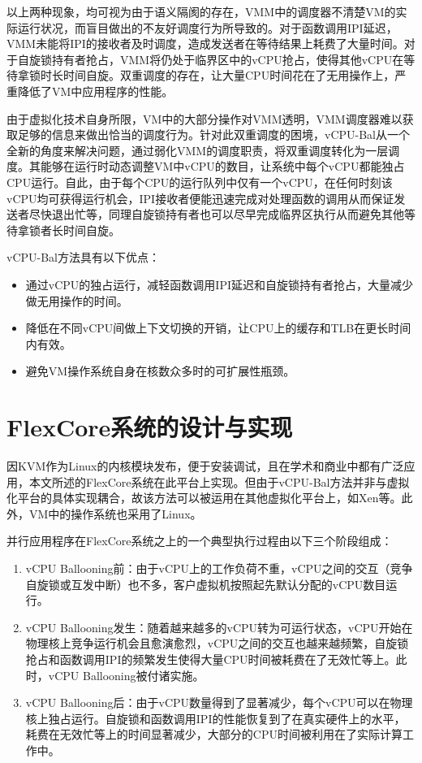 以上两种现象，均可视为由于语义隔阂的存在，VMM中的调度器不清楚VM的实际运行状况，而盲目做出的不友好调度行为所导致的。对于函数调用IPI延迟，VMM未能将IPI的接收者及时调度，造成发送者在等待结果上耗费了大量时间。对于自旋锁持有者抢占，VMM将仍处于临界区中的vCPU抢占，使得其他vCPU在等待拿锁时长时间自旋。双重调度的存在，让大量CPU时间花在了无用操作上，严重降低了VM中应用程序的性能。

由于虚拟化技术自身所限，VM中的大部分操作对VMM透明，VMM调度器难以获取足够的信息来做出恰当的调度行为。针对此双重调度的困境，vCPU-Bal从一个全新的角度来解决问题\cite{song2013schedule}，通过弱化VMM的调度职责，将双重调度转化为一层调度。其能够在运行时动态调整VM中vCPU的数目，让系统中每个vCPU都能独占CPU运行。自此，由于每个CPU的运行队列中仅有一个vCPU，在任何时刻该vCPU均可获得运行机会，IPI接收者便能迅速完成对处理函数的调用从而保证发送者尽快退出忙等，同理自旋锁持有者也可以尽早完成临界区执行从而避免其他等待拿锁者长时间自旋。

vCPU-Bal方法具有以下优点：

\begin{itemize}
\item 通过vCPU的独占运行，减轻函数调用IPI延迟和自旋锁持有者抢占，大量减少做无用操作的时间。
\item 降低在不同vCPU间做上下文切换的开销，让CPU上的缓存和TLB在更长时间内有效。
\item 避免VM操作系统自身在核数众多时的可扩展性瓶颈\cite{boyd2010analysis}。
\end{itemize}



\section{FlexCore系统的设计与实现}

因KVM\cite{kivity2007kvm}作为Linux的内核模块发布，便于安装调试，且在学术和商业中都有广泛应用，本文所述的FlexCore系统在此平台上实现。但由于vCPU-Bal方法并非与虚拟化平台的具体实现耦合，故该方法可以被运用在其他虚拟化平台上，如Xen\cite{barham2003xen}等。此外，VM中的操作系统也采用了Linux。

并行应用程序在FlexCore系统之上的一个典型执行过程由以下三个阶段组成：

\begin{enumerate}
\item vCPU Ballooning前：由于vCPU上的工作负荷不重，vCPU之间的交互（竞争自旋锁或互发中断）也不多，客户虚拟机按照起先默认分配的vCPU数目运行。
\item vCPU Ballooning发生：随着越来越多的vCPU转为可运行状态，vCPU开始在物理核上竞争运行机会且愈演愈烈，vCPU之间的交互也越来越频繁，自旋锁抢占和函数调用IPI的频繁发生使得大量CPU时间被耗费在了无效忙等上。此时，vCPU Ballooning被付诸实施。
\item vCPU Ballooning后：由于vCPU数量得到了显著减少，每个vCPU可以在物理核上独占运行。自旋锁和函数调用IPI的性能恢复到了在真实硬件上的水平，耗费在无效忙等上的时间显著减少，大部分的CPU时间被利用在了实际计算工作中。
\end{enumerate}

